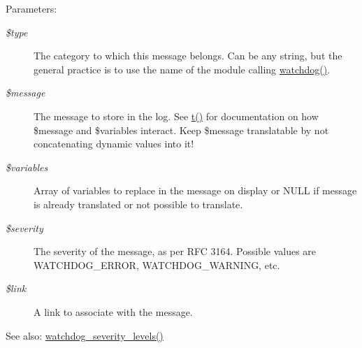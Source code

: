\begin{Desc}
\item[Parameters:]
\begin{description}
\item[{\em \$type}]The category to which this message belongs. Can be any string, but the general practice is to use the name of the module calling \hyperlink{bootstrap_8inc_cb7338e6740302727043d64e3ae1257b}{watchdog()}. \item[{\em \$message}]The message to store in the log. See \hyperlink{common_8inc_41d20f0c822bf1f3c26a97981c762665}{t()} for documentation on how \$message and \$variables interact. Keep \$message translatable by not concatenating dynamic values into it! \item[{\em \$variables}]Array of variables to replace in the message on display or NULL if message is already translated or not possible to translate. \item[{\em \$severity}]The severity of the message, as per RFC 3164. Possible values are WATCHDOG\_\-ERROR, WATCHDOG\_\-WARNING, etc. \item[{\em \$link}]A link to associate with the message.\end{description}
\end{Desc}
\begin{Desc}
\item[See also:]\hyperlink{common_8inc_fb5d4b58ec7e483153644c0f664e0ca4}{watchdog\_\-severity\_\-levels()} \end{Desc}
